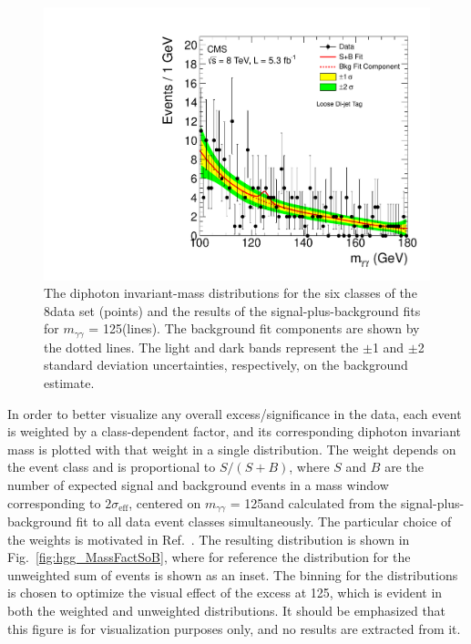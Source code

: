 \documentclass[12pt,twoside,a4paper,cmspaper,final,collab]{cms-tdr}
\begin{document}
\begin{figure}[htbp]
\begin{center}
    \includegraphics[width=0.45\linewidth]{figures/hgg_mvacat5_8TeV}
    \caption{The diphoton invariant-mass distributions for the six classes of the 8\TeV data set (points) and the results of the
    signal-plus-background fits for $m_{\gamma\gamma}$ = 125\GeV (lines). The background fit components are shown by the dotted lines.
     The light and dark bands represent the ${\pm}$1 and ${\pm}$2 standard deviation
       uncertainties, respectively, on the background estimate.
    }
    \label{fig:hgg_BckSig8TeV}
  \end{center}
\end{figure}



In order to better visualize any overall excess/significance in the data,
each event is weighted by a class-dependent factor, and its corresponding diphoton invariant mass is plotted
with that weight in a single distribution. The weight depends on the event class and is proportional to $S/(S+B)$,
where $S$ and $B$ are the number of
expected signal and background events in a mass window corresponding
to $2\sigma_\text{eff}$, centered on $m_{\gamma\gamma}$ = 125\GeV and
calculated from the signal-plus-background fit to all data event classes simultaneously.
The particular choice of the weights is motivated in Ref.~\cite{Barlow:1986ek}.
The resulting distribution is shown in Fig.~\ref{fig:hgg_MassFactSoB}, where
for reference the distribution for the unweighted sum of events is shown as an inset.
The binning for the distributions is chosen to optimize the visual effect
of the excess at 125\GeV, which is evident in both the weighted and unweighted
distributions. It should be emphasized that this figure is for visualization
purposes only, and no results are extracted from it.
\end{document}
